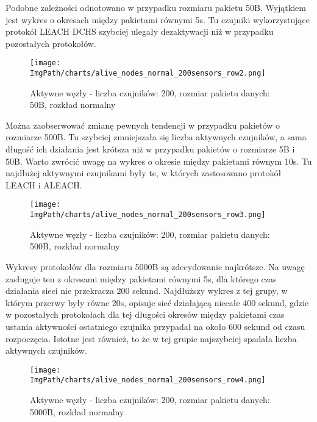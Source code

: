 Podobne zależności odnotowano w przypadku rozmiaru pakietu 50B. Wyjątkiem jest wykres o okresach między pakietami równymi 5s. Tu czujniki wykorzystujące protokół LEACH DCHS szybciej ulegały dezaktywacji niż w przypadku pozostałych protokołów. 

\begin{figure}[H]
	\begin{center}
		\texttt{[image: \\ImgPath/charts/alive\_nodes\_normal\_200sensors\_row2.png]}
	\end{center}
	\caption{Aktywne węzły - liczba czujników: 200, rozmiar pakietu danych: 50B, rozkład normalny}
\end{figure}


Można zaobserwować zmianę pewnych tendencji w przypadku pakietów o rozmiarze 500B. Tu szybciej zmniejszała się liczba aktywnych czujników, a sama długość ich działania jest krótsza niż w przypadku pakietów o rozmiarze 5B i 50B. Warto zwrócić uwagę na wykres o okresie między pakietami równym 10s. Tu najdłużej aktywnymi czujnikami były te, w których zastosowano protokół LEACH i ALEACH.

\begin{figure}[H]
	\begin{center}
		\texttt{[image: \\ImgPath/charts/alive\_nodes\_normal\_200sensors\_row3.png]}
	\end{center}
	\caption{Aktywne węzły - liczba czujników: 200, rozmiar pakietu danych: 500B, rozkład normalny}
\end{figure}

 
Wykresy protokołów dla rozmiaru 5000B są zdecydowanie najkrótsze. Na uwagę zasługuje ten z okresami między pakietami równymi 5s, dla którego czas działania sieci nie przekracza 200 sekund. Najdłuższy wykres z tej grupy, w którym przerwy były równe 20s, opisuje sieć działającą niecałe 400 sekund, gdzie w pozostałych protokołach dla tej długości okresów między pakietami czas ustania aktywności ostatniego czujnika przypadał na około 600 sekund od czasu rozpoczęcia. Istotne jest również, to że w tej grupie najszybciej spadała liczba aktywnych czujników.

\begin{figure}[H]
	\begin{center}
		\texttt{[image: \\ImgPath/charts/alive\_nodes\_normal\_200sensors\_row4.png]}
	\end{center}
	\caption{Aktywne węzły - liczba czujników: 200, rozmiar pakietu danych: 5000B, rozkład normalny}
\end{figure}
 

